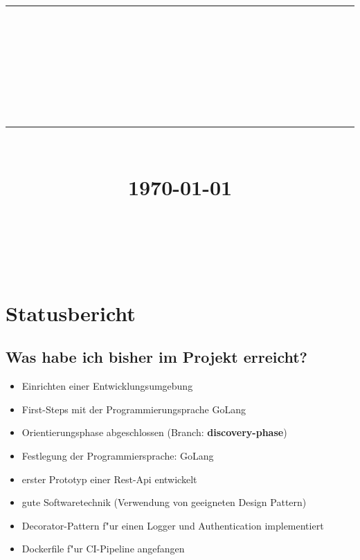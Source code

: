 \documentclass[12pt]{article}
\newcommand{\HRule}[1]{\rule{\linewidth}{#1}}
\begin{document}
\title{ \normalsize
		\HRule{0.5pt} \\
		\LARGE \textbf{\uppercase{\newCommandDiscipline}} \\
    \smallbreak
		\small\textbf{{\newCommandTerm}}\\
		\HRule{2pt} \\ [0.5cm]
		\normalsize \today \vspace*{10\baselineskip}}

\date{}

\author{
		\newCommandName \\
		\newCommandMatriculationNumber \\
		\newCommandUniversity \\
		\newCommandFaculty
}


\maketitle

\newpage



\sectionfont{\scshape}


\section{Statusbericht}
\subsection{Was habe ich bisher im Projekt erreicht?}
\begin{itemize}
\item Einrichten einer Entwicklungsumgebung
\item First-Steps mit der Programmierungsprache GoLang
\item Orientierungsphase abgeschlossen (Branch: \textbf{discovery-phase})
\item Festlegung der Programmiersprache: GoLang
\item erster Prototyp einer Rest-Api entwickelt
\item gute Softwaretechnik (Verwendung von geeigneten Design Pattern)
\item Decorator-Pattern f"ur einen Logger und Authentication implementiert
\item Dockerfile f"ur CI-Pipeline angefangen
\end{itemize}
\end{document}
